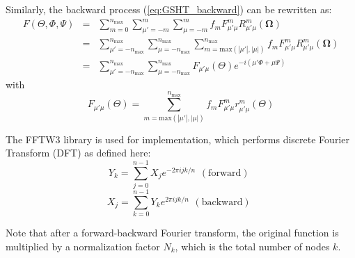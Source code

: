 Similarly, the backward process (\ref{eq:GSHT_backward}) can be rewritten
as:
\begin{eqnarray}
F(\Theta,\Phi,\Psi) & = & \sum_{m=0}^{n_{\mathrm{max}}}\sum_{\mu'=-m}^{m}\sum_{\mu=-m}^{m}f_{m}F_{\mu'\mu}^{m}R_{\mu'\mu}^{m}(\mathbf{\Omega})\nonumber \\
 & = & \sum_{\mu'=-n_{\mathrm{max}}}^{n_{\mathrm{max}}}\sum_{\mu=-n_{\mathrm{max}}}^{n_{\mathrm{max}}}\sum_{m=\mathrm{max}\left(\left|\mu'\right|,\left|\mu\right|\right)}^{n_{\mathrm{max}}}f_{m}F_{\mu'\mu}^{m}R_{\mu'\mu}^{m}(\mathbf{\Omega})\nonumber \\
 & = & \sum_{\mu'=-n_{\mathrm{max}}}^{n_{\mathrm{max}}}\sum_{\mu=-n_{\mathrm{max}}}^{n_{\mathrm{max}}}F_{\mu'\mu}(\Theta)e^{-i(\mu'\Phi+\mu\Psi)}\label{eq:f_mup_mu_2}
\end{eqnarray}
with
\begin{equation}
F_{\mu'\mu}(\Theta)=\sum_{m=\mathrm{max}\left(\left|\mu'\right|,\left|\mu\right|\right)}^{n_{\mathrm{max}}}f_{m}F_{\mu'\mu}^{m}r_{\mu'\mu}^{m}(\Theta)\label{eq:f_mup_mu_3}
\end{equation}


The FFTW3 library \citep{FFTW3} is used for implementation, which
performs discrete Fourier Transform (DFT) as defined here:
\begin{equation}
Y_{k}=\sum_{j=0}^{n-1}X_{j}e^{-2\pi ijk/n}\begin{array}{c}
\mathrm{(forward)}\end{array}\label{eq:fftw3-fwd}
\end{equation}
\begin{equation}
X_{j}=\sum_{k=0}^{n-1}Y_{k}e^{2\pi ijk/n}\begin{array}{c}
\mathrm{(backward)}\end{array}\label{eq:fftw3-bwd}
\end{equation}


Note that after a forward-backward Fourier transform, the original
function is multiplied by a normalization factor $N_{k}$, which is
the total number of nodes $k$.

